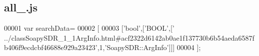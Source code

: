 \subsection{all\+\_.\+js}
\label{all__1_8js_source}

\begin{DoxyCode}
00001 var searchData=
00002 [
00003   [\textcolor{stringliteral}{'bool'},[\textcolor{stringliteral}{'BOOL'},[\textcolor{stringliteral}{'
      ../classSoapySDR\_1\_1ArgInfo.html#acf2322d6142ab0ae1f137730b6b54aeda6587fb406f9ecdcbf46688e929a23423'},1,\textcolor{stringliteral}{'SoapySDR::ArgInfo'}]]]
00004 ];
\end{DoxyCode}
